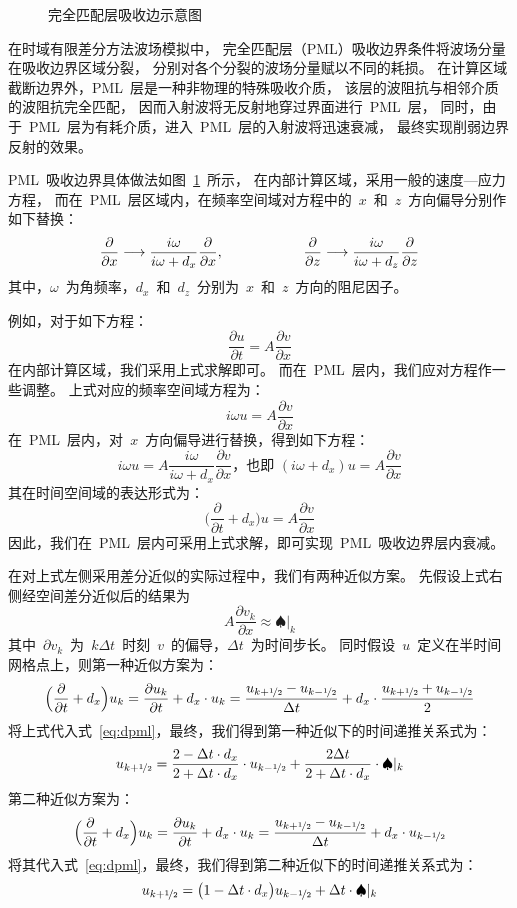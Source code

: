 \documentclass[UTF8]{ctexart}
\begin{document}
\begin{figure}[h]
  \centering
  
  \caption{完全匹配层吸收边示意图}\label{fig:pml}
\end{figure}
在时域有限差分方法波场模拟中，
完全匹配层（PML）吸收边界条件将波场分量在吸收边界区域分裂，
分别对各个分裂的波场分量赋以不同的耗损。
在计算区域截断边界外，PML~层是一种非物理的特殊吸收介质，
该层的波阻抗与相邻介质的波阻抗完全匹配，
因而入射波将无反射地穿过界面进行~PML~层，
同时，由于~PML~层为有耗介质，进入~PML~层的入射波将迅速衰减，
最终实现削弱边界反射的效果。

PML~吸收边界具体做法如图~\ref{fig:pml}~所示，
在内部计算区域，采用一般的速度—应力方程，
而在~PML~层区域内，在频率空间域对方程中的~$x$~和~$z$~方向偏导分别作如下替换：
\[ \frac{\partial}{\partial x}\longrightarrow\frac{i\omega}{i\omega+d_x}\frac{\partial}{\partial x},\hspace{20mm} \frac{\partial}{\partial z}\longrightarrow\frac{i\omega}{i\omega+d_z}\frac{\partial}{\partial z} \]
其中，$\omega$~为角频率，$d_x$~和~$d_z$~分别为~$x$~和~$z$~方向的阻尼因子。

例如，对于如下方程：
\[ \frac{\partial u}{\partial t}=A\frac{\partial v}{\partial x} \]
在内部计算区域，我们采用上式求解即可。
而在~PML~层内，我们应对方程作一些调整。
上式对应的频率空间域方程为：
\[ i\omega u=A\frac{\partial v}{\partial x} \]
在~PML~层内，对~$x$~方向偏导进行替换，得到如下方程：
\[ i\omega u=A\frac{i\omega}{i\omega+d_x}\frac{\partial v}{\partial x} \text{，也即~} (i\omega+d_x)u=A\frac{\partial v}{\partial x} \]
其在时间空间域的表达形式为：
\begin{equation}\label{eq:dpml}
\Big(\frac{\partial}{\partial t}+d_x\Big)u=A\frac{\partial v}{\partial x}
\end{equation}
因此，我们在~PML~层内可采用上式求解，即可实现~PML~吸收边界层内衰减。

在对上式左侧采用差分近似的实际过程中，我们有两种近似方案。
先假设上式右侧经空间差分近似后的结果为
\[ A\dfrac{\partial v_k}{\partial x}\approx\spadesuit|_k \]
其中~$\partial v_k$~为~$k\Delta t$~时刻~$v$~的偏导，$\Delta t$~为时间步长。
同时假设~$u$~定义在半时间网格点上，则第一种近似方案为：
\[ \Big(\frac{\partial}{\partial t}+d_x\Big)u_k=\frac{\partial u_k}{\partial t}+d_x\cdot u_k=\frac{u_{k+\nicefrac{1}{2}}-u_{k-\nicefrac{1}{2}}}{\Delta t}+d_x\cdot\frac{u_{k+\nicefrac{1}{2}}+u_{k-\nicefrac{1}{2}}}{2} \]
将上式代入式~\eqref{eq:dpml}，最终，我们得到第一种近似下的时间递推关系式为：
\begin{equation}\label{eq:pml1}
u_{k+\nicefrac{1}{2}}=\frac{2-\Delta t\cdot d_x}{2+\Delta t\cdot d_x}\cdot u_{k-\nicefrac{1}{2}}+\frac{2\Delta t}{2+\Delta t\cdot d_x}\cdot\spadesuit|_k
\end{equation}
第二种近似方案为：
\[ \Big(\frac{\partial}{\partial t}+d_x\Big)u_k=\frac{\partial u_k}{\partial t}+d_x\cdot u_k=\frac{u_{k+\nicefrac{1}{2}}-u_{k-\nicefrac{1}{2}}}{\Delta t}+d_x\cdot u_{k-\nicefrac{1}{2}} \]
将其代入式~\eqref{eq:dpml}，最终，我们得到第二种近似下的时间递推关系式为：
\begin{equation}\label{eq:pml2}
u_{k+\nicefrac{1}{2}}=\big(1-\Delta t\cdot d_x\big)u_{k-\nicefrac{1}{2}}+\Delta t\cdot\spadesuit|_k
\end{equation}
\end{document}
